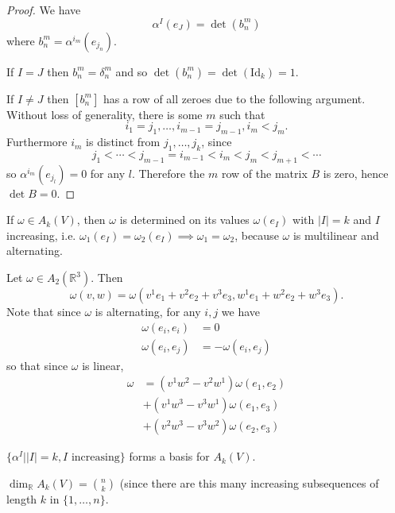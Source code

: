 \begin{proof}
We have
$$
\alpha^I(e_J) = \det(b_n^m)
$$
where $b_n^m = \alpha^{i_m}(e_{j_n})$.

If $I = J$ then $b_n^m = \delta_n^m$ and so
$\det (b_n^m) = \det(\mathrm{Id}_k) = 1$.

If $I \neq J$ then $[b_n^m]$ has a row of all zeroes due to the
following argument. Without loss of
generality, there is some $m$ such that
$$
i_1 = j_1, \dots, i_{m-1} = j_{m-1}, i_m < j_m.
$$
Furthermore $i_m$ is distinct from $j_1, \dots, j_k$, since
$$
j_1 < \cdots < j_{m-1} = i_{m-1} < i_m < j_m < j_{m+1} < \cdots
$$
so $\alpha^{i_m}(e_{j_l}) = 0$ for any $l$. Therefore the $m$ row of
the matrix $B$ is zero, hence $\det B = 0$.
\end{proof}

\begin{remark}
If $\omega \in A_k(V)$, then $\omega$ is determined on its values
$\omega(e_I)$ with $|I| = k$ and $I$ increasing, i.e.
$\omega_1(e_I) = \omega_2(e_I) \implies \omega_1 = \omega_2$,
because $\omega$ is multilinear and alternating.

\begin{xmpl}
Let $\omega \in A_2(\mathbb{R}^3)$. Then
$$
  \omega(v, w)
= \omega(v^1 e_1 + v^2 e_2 + v^3 e_3,
         w^1 e_1 + w^2 e_2 + w^3 e_3).
$$
Note that since $\omega$ is alternating, for any $i, j$ we have
\begin{align*}
  \omega(e_i, e_i) &= 0 \\
  \omega(e_i, e_j) &= -\omega(e_i, e_j)
\end{align*}
so that since $\omega$ is linear,
\begin{align*}
   \omega
&= (v^1 w^2 - v^2 w^1)\omega(e_1, e_2) \\
&+ (v^1 w^3 - v^3 w^1)\omega(e_1, e_3) \\
&+ (v^2 w^3 - v^3 w^2)\omega(e_2, e_3)
\end{align*}
\end{xmpl}
\end{remark}

\begin{prop}
$\{ \alpha^I | |I| = k, I \text{ increasing}\}$ forms a basis for $A_k(V)$.
\end{prop}
\begin{corol}
$\dim_{\mathbb{R}} A_k(V) = {n \choose k}$ (since there are this many
increasing subsequences of length $k$ in $\{1, \dots, n\}$.
\end{corol}

